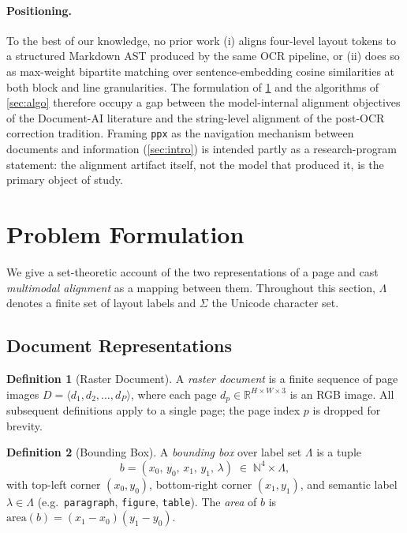 \documentclass{article}
\theoremstyle{definition}
\newtheorem{definition}{Definition}[section]
\begin{document}
\paragraph{Positioning.}  To the best of our knowledge, no prior
work (i) aligns four-level layout tokens to a structured Markdown
AST produced by the same OCR pipeline, or (ii) does so as
max-weight bipartite matching over sentence-embedding cosine
similarities at both block and line granularities.  The formulation
of \cref{sec:formal} and the algorithms of \cref{sec:algo}
therefore occupy a gap between the model-internal alignment
objectives of the Document-AI literature and the string-level
alignment of the post-OCR correction tradition.  Framing \texttt{ppx}
as the navigation mechanism between documents and information
(\cref{sec:intro}) is intended partly as a research-program
statement: the alignment artifact itself, not the model that
produced it, is the primary object of study.

\section{Problem Formulation}
\label{sec:formal}

We give a set-theoretic account of the two representations of a page and
cast \emph{multimodal alignment} as a mapping between them.  Throughout
this section, $\Lambda$ denotes a finite set of layout labels and $\Sigma$
the Unicode character set.

\subsection{Document Representations}

\begin{definition}[Raster Document]
      A \emph{raster document} is a finite sequence of page images
      $D = \langle d_1, d_2, \ldots, d_P \rangle$, where each page
      $d_p \in \mathbb{R}^{H \times W \times 3}$ is an RGB image.  All
      subsequent definitions apply to a single page; the page index $p$ is
      dropped for brevity.
\end{definition}

\begin{definition}[Bounding Box]
      A \emph{bounding box} over label set $\Lambda$ is a tuple
      \[
            b = (x_0,\, y_0,\, x_1,\, y_1,\, \lambda)
            \;\in\; \mathbb{N}^4 \times \Lambda,
      \]
      with top-left corner $(x_0, y_0)$, bottom-right corner $(x_1, y_1)$, and
      semantic label $\lambda \in \Lambda$ (e.g.\ \texttt{paragraph},
      \texttt{figure}, \texttt{table}).  The \emph{area} of $b$ is
      $\mathrm{area}(b) = (x_1 - x_0)(y_1 - y_0)$.
\end{definition}
\end{document}
